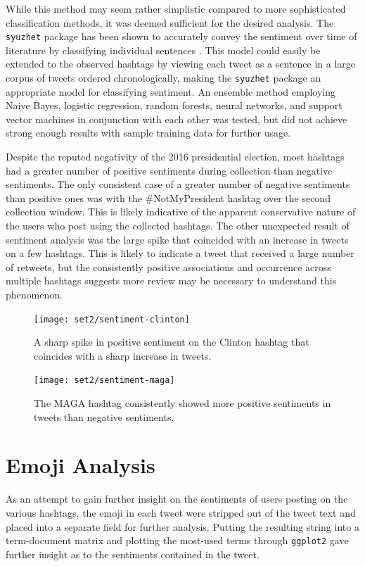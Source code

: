 \documentclass[prodmode]{acmsmall} %
\begin{document}
While this method may seem rather simplistic compared to more sophisticated
classification methods, it was deemed sufficient for the desired analysis. The
\verb|syuzhet| package has been shown to accurately convey the sentiment over
time of literature by classifying individual sentences \cite{jockers}. This
model could easily be extended to the observed hashtags by viewing each tweet as
a sentence in a large corpus of tweets ordered chronologically, making the
\verb|syuzhet| package an appropriate model for classifying sentiment. An
ensemble method employing Naive Bayes, logistic regression, random forests,
neural networks, and support vector machines in conjunction with each other was
tested, but did not achieve strong enough results with sample training data for
further usage.

Despite the reputed negativity of the 2016 presidential election, most hashtags
had a greater number of positive sentiments during collection than negative
sentiments. The only consistent case of a greater number of negative sentiments
than positive ones was with the \#NotMyPresident hashtag over the second
collection window. This is likely indicative of the apparent conservative nature
of the users who post using the collected hashtags. The other unexpected result
of sentiment analysis was the large spike that coincided with an increase in
tweets on a few hashtags. This is likely to indicate a tweet that received a
large number of retweets, but the consistently positive associations and
occurrence across multiple hashtags suggests more review may be necessary to
understand this phenomenon.

\begin{figure}
\centering
\begin{minipage}[b]{.49\textwidth}
    \texttt{[image: set2/sentiment-clinton]}
\caption{A sharp spike in positive sentiment on the Clinton hashtag that
  coincides with a sharp increase in tweets.}\label{clinton sentiment}
\end{minipage}\hfill
\begin{minipage}[b]{.49\textwidth}
    \texttt{[image: set2/sentiment-maga]}
\caption{The MAGA hashtag consistently showed more positive sentiments in tweets
  than negative sentiments.}
\label{maga chart}
\end{minipage}
\end{figure}

\section{Emoji Analysis}
As an attempt to gain further insight on the sentiments of users posting on the
various hashtags, the emoji in each tweet were stripped out of the tweet text
and placed into a separate field for further analysis. Putting the resulting
string into a term-document matrix and plotting the most-used terms through
\verb|ggplot2| gave further insight as to the sentiments contained in the tweet.
\end{document}
